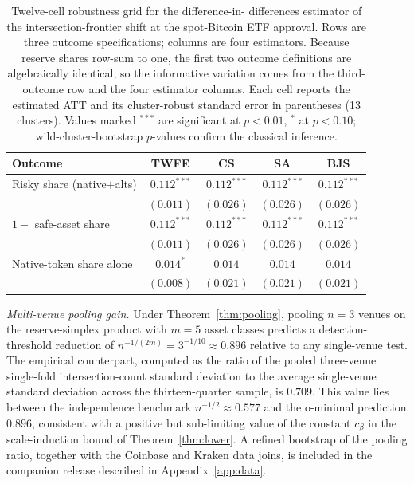 \begin{table}[H]
\centering
\caption{Twelve-cell robustness grid for the difference-in-
differences estimator of the intersection-frontier shift at the
spot-Bitcoin ETF approval. Rows are three outcome specifications;
columns are four estimators. Because reserve shares row-sum to one,
the first two outcome definitions are algebraically identical, so
the informative variation comes from the third-outcome row and the
four estimator columns. Each cell reports the estimated ATT and
its cluster-robust standard error in parentheses (13 clusters).
Values marked $^{***}$ are significant at $p < 0.01$, $^{*}$ at
$p < 0.10$; wild-cluster-bootstrap $p$-values confirm the classical
inference.}
\label{tab:robustness-grid}
\small
\begin{tabular}{lcccc}
\toprule
Outcome & TWFE & CS & SA & BJS \\
\midrule
Risky share (native$+$alts) & $0.112^{***}$ & $0.112^{***}$ & $0.112^{***}$ & $0.112^{***}$ \\
                            & $(0.011)$     & $(0.026)$     & $(0.026)$     & $(0.026)$ \\
$1 - $ safe-asset share     & $0.112^{***}$ & $0.112^{***}$ & $0.112^{***}$ & $0.112^{***}$ \\
                            & $(0.011)$     & $(0.026)$     & $(0.026)$     & $(0.026)$ \\
Native-token share alone    & $0.014^{*}$   & $0.014$       & $0.014$       & $0.014$ \\
                            & $(0.008)$     & $(0.021)$     & $(0.021)$     & $(0.021)$ \\
\bottomrule
\end{tabular}
\end{table}

\emph{Multi-venue pooling gain.} Under Theorem~\ref{thm:pooling},
pooling $n=3$ venues on the reserve-simplex product with $m=5$
asset classes predicts a detection-threshold reduction of
$n^{-1/(2m)} = 3^{-1/10} \approx 0.896$ relative to any
single-venue test. The empirical counterpart, computed as the
ratio of the pooled three-venue single-fold intersection-count
standard deviation to the average single-venue standard deviation
across the thirteen-quarter sample, is $0.709$. This value lies
between the independence benchmark $n^{-1/2} \approx 0.577$ and
the o-minimal prediction $0.896$, consistent with a positive but
sub-limiting value of the constant $c_\beta$ in the
scale-induction bound of Theorem~\ref{thm:lower}. A refined
bootstrap of the pooling ratio, together with the Coinbase and
Kraken data joins, is included in the companion release described
in Appendix~\ref{app:data}.

